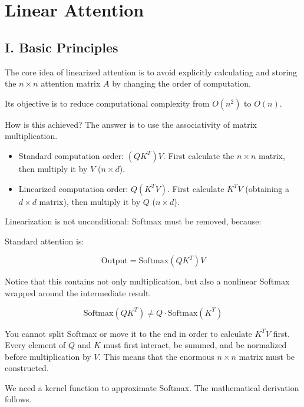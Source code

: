 \setcounter{section}{7}

\hypertarget{linear-attention}{%
\section{Linear Attention}\label{linear-attention}}

\hypertarget{i.-basic-principles-1}{%
\subsection{I. Basic Principles}\label{i.-basic-principles-1}}

The core idea of linearized attention is to avoid explicitly calculating and storing the \(n \times n\) attention matrix \(A\) by changing the order of computation.

Its objective is to reduce computational complexity from \(O(n^2)\) to \(O(n)\).

How is this achieved? The answer is to use the associativity of matrix multiplication.

\begin{itemize}
\tightlist
\item
  Standard computation order: \((QK^T)V\). First calculate the \(n \times n\) matrix, then multiply it by \(V\) (\(n \times d\)).
\item
  Linearized computation order: \(Q(K^T V)\). First calculate \(K^T V\) (obtaining a \(d \times d\) matrix), then multiply it by \(Q\) (\(n \times d\)).
\end{itemize}

Linearization is not unconditional: Softmax must be removed, because:

Standard attention is:

\[
\mathrm{Output} = \mathrm{Softmax}(QK^T)V
\]

Notice that this contains not only multiplication, but also a nonlinear Softmax wrapped around the intermediate result.

\[
\mathrm{Softmax}(QK^T) \ne Q \cdot \mathrm{Softmax}(K^T)
\]

You cannot split Softmax or move it to the end in order to calculate \(K^T V\) first. Every element of \(Q\) and \(K\) must first interact, be summed, and be normalized before multiplication by \(V\). This means that the enormous \(n \times n\) matrix must be constructed.

We need a kernel function to approximate Softmax. The mathematical derivation follows.


